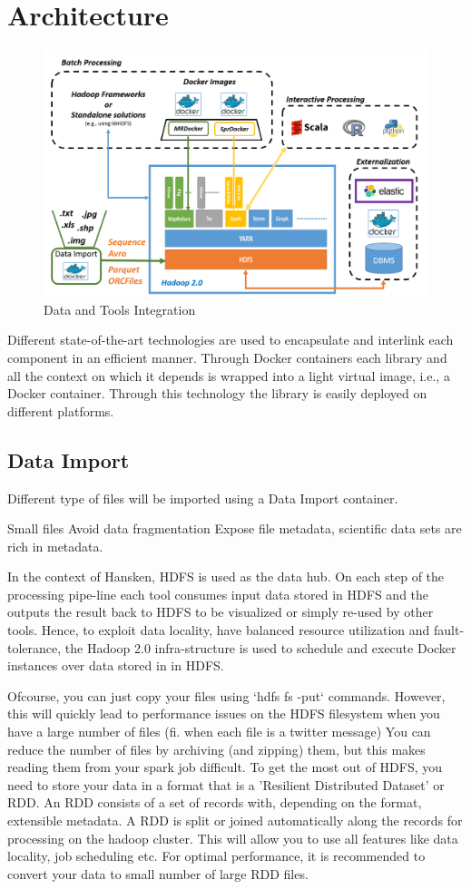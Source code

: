 \section{Architecture}
\label{architecture}

\begin{figure}[lb]
\centering
\includegraphics[width=.48\textwidth]{fig/diagram_2.png}
\caption{Data and Tools Integration}
\label{architecture}
\end{figure}

Different state-of-the-art technologies are used to encapsulate and interlink each component in an efficient manner.
Through Docker containers each library and all the context on which it depends is wrapped into a light virtual
image, i.e., a Docker container. Through this technology the library is easily deployed on different platforms.

\subsection{Data Import}
Different type of files will be imported using a Data Import container.

Small files
Avoid data fragmentation
Expose file metadata, scientific data sets are rich in metadata.

In the context of Hansken, HDFS is used as the data hub. On each step of the processing pipe-line each
tool consumes input data stored in HDFS and the outputs the result back to HDFS to be visualized or simply
re-used by other tools. Hence, to exploit data locality, have balanced resource utilization and fault-tolerance,
the Hadoop 2.0 infra-structure is used to schedule and execute Docker instances over data stored in in HDFS.

Ofcourse, you can just copy your files using `hdfs fs -put` commands.
However, this will quickly lead to performance issues on the HDFS filesystem when you have a large number of files (fi. when each file is a twitter message)
You can reduce the number of files by archiving (and zipping) them, but this makes reading them from your spark job difficult.
To get the most out of HDFS, you need to store your data in a format that is a 'Resilient Distributed Dataset' or RDD.
An RDD consists of a set of records with, depending on the format, extensible metadata.
A RDD is split or joined automatically along the records for processing on the hadoop cluster.
This will allow you to use all features like data locality, job scheduling etc.
For optimal performance, it is recommended to convert your data to small number of large RDD files.

